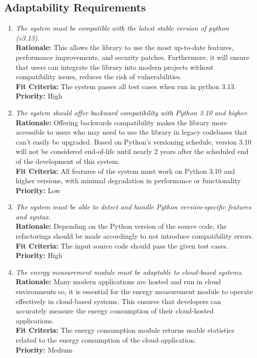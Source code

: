 \documentclass[12pt]{article}
\begin{document}
\subsection{Adaptability Requirements}
\begin{enumerate}[label=MS-AD \arabic*., wide=0pt, leftmargin=*]
  \item \emph{The system must be compatible with the latest stable version of python (v3.13).}\\
  {\bf Rationale:} This allows the library to use the most up-to-date features, performance improvements, and security patches. Furthermore, it will ensure that users can integrate the library into modern projects without compatibility issues, reduces the risk of vulnerabilities.\\
  {\bf Fit Criteria:} The system passes all test cases when run in python 3.13.\\
  {\bf Priority:} High

  \item \emph{The system should offer backward compatibility with Python 3.10 and higher.}\\
  {\bf Rationale:} Offering backwards compatibility makes the library more accessible to users who may need to use the library in legacy codebases that can't easily be upgraded. Based on Python's versioning schedule, version 3.10 will not be considered end-of-life until nearly 2 years after the scheduled end of the development of this system.\\
  {\bf Fit Criteria:} All features of the system must work on Python 3.10 and higher versions, with minimal degradation in performance or functionality\\
  {\bf Priority:} Low

  \item \emph{The system must be able to detect and handle Python version-specific features and syntax.}\\
  {\bf Rationale:} Depending on the Python version of the source code, the refactorings should be made accordingly to not introduce compatibility errors.\\
  {\bf Fit Criteria:} The input source code should pass the given test cases.\\
  {\bf Priority:} High

  \item \emph{The energy measurement module must be adaptable to cloud-based systems.}\\
  {\bf Rationale:} Many modern applications are hosted and run in cloud environments so, it is essential for the energy measurement module to operate effectively in cloud-based systems. This ensures that developers can accurately measure the energy consumption of their cloud-hosted applications.\\
  {\bf Fit Criteria:} The energy consumption module returns usable statistics related to the energy consumption of the cloud-application.\\
  {\bf Priority:} Medium


\end{enumerate}
\end{document}
